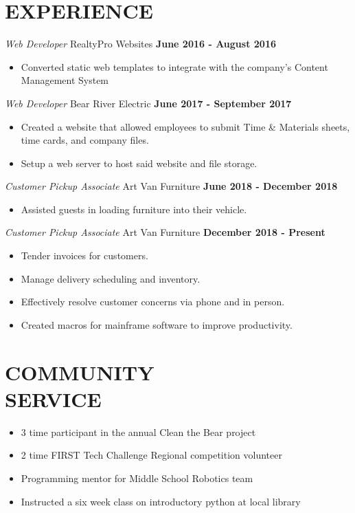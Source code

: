 \documentclass[margin, line]{res}
\begin{document}
\begin{resume}
  \section{EXPERIENCE}
    {\sl Web Developer} \hfill RealtyPro Websites \hfill \textbf{June 2016
    - August 2016} \\
  \begin{itemize}
    \item Converted static web templates to integrate with the company's
      Content Management System
  \end{itemize}

    {\sl Web Developer} \hfill Bear River Electric \hfill \textbf{June 2017
    - September 2017} \\
  \begin{itemize}
    \item Created a website that allowed employees to submit Time \& Materials sheets,
      time cards, and company files.

    \item Setup a web server to host said website and file storage.
  \end{itemize}

    {\sl Customer Pickup Associate} \hfill Art Van Furniture \hfill \textbf{June 2018
    - December 2018} \\
  \begin{itemize}
    \item Assisted guests in loading furniture into their vehicle.
  \end{itemize}

    {\sl Customer Pickup Associate} \hfill Art Van Furniture \hfill \textbf{December
    2018 - Present} \\
  \begin{itemize}
    \item Tender invoices for customers.

    \item Manage delivery scheduling and inventory.

    \item Effectively resolve customer concerns via phone and in person.

    \item Created macros for mainframe software to improve productivity.

  \end{itemize}

\section{COMMUNITY \\ SERVICE}
    \begin{itemize}
      \item 3 time participant in the annual Clean the Bear project
      \item 2 time FIRST Tech Challenge Regional competition volunteer
      \item Programming mentor for Middle School Robotics team
      \item Instructed a six week class on introductory python at local library
    \end{itemize}


\end{resume}
\end{document}
